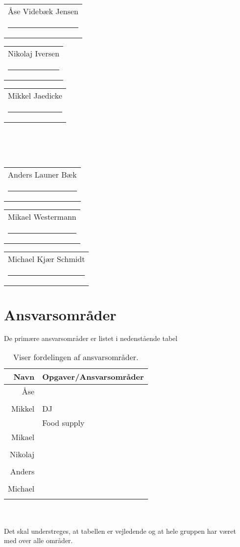 



\vspace{3cm}
{
\newcommand{\namesigdate}[2][5cm]{%
  \begin{tabular}{@{}p{#1}@{}}
    #2 \\[2\normalbaselineskip] \hrule \\[0pt]
  \end{tabular}
}
\begin{changemargin}{-0cm}{-0cm}
\centering
\noindent \namesigdate[4.3cm]{Åse Videbæk Jensen} \hspace{1cm} \namesigdate[4.3cm]{Nikolaj Iversen} \hspace{1cm} \namesigdate[4.3cm]{Mikkel Jaedicke} \\~\\~\\
\centering
\noindent \namesigdate[4.3cm]{Anders Launer Bæk} \hspace{1cm}  \namesigdate[4.3cm]{Mikael Westermann} \hspace{1cm}   \namesigdate[4.3cm]{Michael Kjær Schmidt}
\end{changemargin}
}
\bigskip
\section*{Ansvarsområder}
De primære ansvarsområder er listet i nedenstående tabel
\bigskip
\begin{table}[!th]
\centering
\setlength{\extrarowheight}{5pt}
 \begin{tabular}{r|l}
Navn&Opgaver/Ansvarsområder \\[6pt] \hline
Åse&\\
&\\[6pt] \hline
Mikkel& DJ\\ 
& Food supply\\[6pt] \hline
Mikael&\\
&\\[6pt] \hline
Nikolaj&\\
&\\[6pt] \hline
Anders&\\
&\\[6pt] \hline
Michael & \\
&\\ 
\end{tabular}     
\caption*{Viser fordelingen af ansvarsområder.}            
\end{table}\\~\\ 
Det skal understreges, at tabellen er vejledende og at hele gruppen har været med over alle områder.

